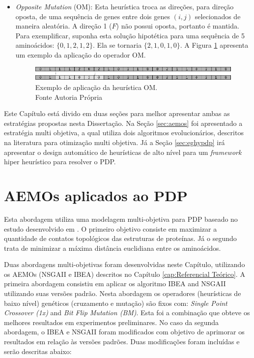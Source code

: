 \begin{itemize}
 	\item \textit{Opposite Mutation} (OM): Esta heurística troca as direções, para direção oposta, de uma sequência de genes entre dois genes $(i,j)$ selecionados de maneira aleatória. A direção 1 ($F$) não possui oposta, portanto é mantida. Para exemplificar, suponha esta solução hipotética para uma sequência de 5 aminoácidos: $\{0,1,2,1,2\}$. Ela se tornaria $\{2,1,0,1,0\}$. A Figura \ref{fig:oppositeMutation} apresenta um exemplo da aplicação do operador OM.
 	
 	
 	\begin{figure}[!htb]
 		\centering
 		\includegraphics[scale=0.8]{Imagens/OppositeMutation.png}
 		\caption{Exemplo de aplicação da heurística OM. \\Fonte Autoria Própria}
 		\label{fig:oppositeMutation}
 	\end{figure}
 	
 	
 	
 \end{itemize} 



 Este Capítulo está divido em duas seções para melhor apresentar ambas as estratégias propostas nesta Dissertação. Na Seção \ref{sec:aemos} foi apresentado a estratégia multi objetiva, a qual utiliza dois algoritmos evolucionários, descritos na literatura para otimização multi objetiva. Já a Seção  \ref{sec:eghypdp} irá apresentar o design automático de heurísticas de alto nível para um \textit{framework} hiper heurístico para resolver o PDP.

	



\section{AEMOs aplicados ao PDP}
\label{sec:aeoms}

Esta abordagem utiliza uma modelagem multi-objetiva para PDP baseado no estudo desenvolvido em \cite{gabriel2012algoritmos}. O primeiro objetivo consiste em maximizar a quantidade de contatos topológicos das estruturas de proteínas. Já o segundo  trata de minimizar a máxima distância euclidiana entre os aminoácidos. 

Duas abordagens multi-objetivas foram desenvolvidas neste Capítulo, utilizando os AEMOs (NSGAII e IBEA) descritos no Capítulo \ref{cap:Referencial Teórico}. A primeira abordagem consistiu em aplicar os algoritmo IBEA and NSGAII utilizando suas versões padrão. Nesta abordagem os operadores (heurísticas de baixo nível) genéticos (cruzamento e mutação) são fixos com: \textit{Single Point Crossover (1x)} and \textit{Bit Flip Mutation (BM)}. Esta foi a combinação que obteve os melhores resultados em experimentos preliminares. No caso da segunda abordagem, o IBEA e NSGAII foram modificados com objetivo de aprimorar os resultados em relação às versões padrões. Duas modificações foram incluídas e serão descritas abaixo:


